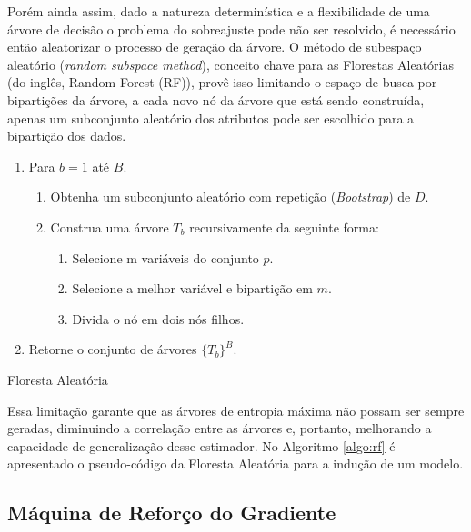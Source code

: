 Porém ainda assim, dado a natureza determinística e a flexibilidade de uma
árvore de decisão o problema do sobreajuste pode não ser resolvido, é
necessário então aleatorizar o processo de geração da árvore. O método de
subespaço aleatório (\textit{random subspace method}), conceito chave para as Florestas Aleatórias (do inglês, Random Forest (RF)), provê isso limitando o
espaço de busca por bipartições da árvore, a cada novo nó da árvore que está
sendo construída, apenas um subconjunto aleatório dos atributos pode ser
escolhido para a bipartição dos dados.

\begin{algorithm}[ht]
\begin{enumerate}
    \item Para $b=1$ até $B$.
    \begin{enumerate}
        \item Obtenha um subconjunto aleatório com repetição
            (\textit{Bootstrap}) de $D$.
        \item Construa uma árvore $T_b$ recursivamente da seguinte forma:
        \begin{enumerate}
            \item Selecione m variáveis do conjunto $p$.
            \item Selecione a melhor variável e bipartição em $m$.
            \item Divida o nó em dois nós filhos.
        \end{enumerate}
    \end{enumerate}
    \item Retorne o conjunto de árvores $\{T_b\}^B$.
\end{enumerate}
 \caption{Floresta Aleatória}
 \label{algo:rf}
\end{algorithm}

Essa limitação garante que as árvores de entropia máxima não possam ser sempre
geradas, diminuindo a correlação entre as árvores e, portanto, melhorando a
capacidade de generalização desse estimador. No Algoritmo \ref{algo:rf} é
apresentado o pseudo-código da Floresta Aleatória para a indução de um modelo.

\subsection{Máquina de Reforço do Gradiente}

